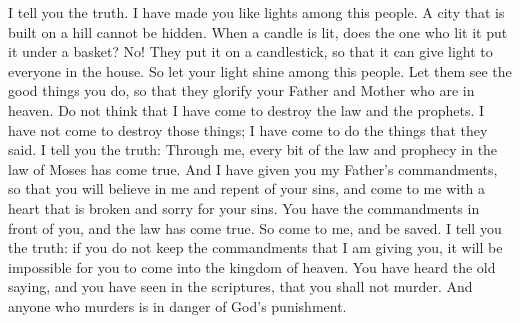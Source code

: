 I tell you the truth. I have made you like lights among this people. A city that is built on a hill cannot be hidden.
\bverse \iffalse Behold, do men light a candle and put it under a bushel? Nay, but on a candlestick, and it giveth light to all that are in the house; \fi
When a candle is lit, does the one who lit it put it under a basket? No! They put it on a candlestick, so that it can give light to everyone in the house.
\bverse \iffalse Therefore let your light so shine before this people, that they may see your good works and glorify your Father who is in heaven. \fi
So let your light shine among this people. Let them see the good things you do, so that they glorify your Father and Mother who are in heaven.
\bverse \iffalse Think not that I am come to destroy the law or the prophets.  I am not come to destroy but to fulfil; \fi
Do not think that I have come to destroy the law and the prophets. I have not come to destroy those things; I have come to do the things that they said.
\bverse \iffalse For verily I say unto you, one jot nor tittle hath not passed away from the law, but in me it hath all been fulfilled. \fi
I tell you the truth: Through me, every bit of the law and prophecy in the law of Moses has come true.
\bverse \iffalse And behold, I have given you the law and the commandments of my Father, that ye shall believe in me, and that ye shall repent of your sins, and come unto me with a broken heart and a contrite spirit. Behold, ye have the commandments before you, and the law is fulfilled. \fi
And I have given you my Father's commandments, so that you will believe in me and repent of your sins, and come to me with a heart that is broken and sorry for your sins. You have the commandments in front of you, and the law has come true.
\bverse \iffalse Therefore come unto me and be ye saved; for verily I say unto you, that except ye shall keep my commandments, which I have commanded you at this time, ye shall in no case enter into the kingdom of heaven. \fi
So come to me, and be saved. I tell you the truth: if you do not keep the commandments that I am giving you, it will be impossible for you to come into the kingdom of heaven.
\bverse \iffalse Ye have heard that it hath been said by them of old time, and it is also written before you, that thou shalt not kill, and whosoever shall kill shall be in danger of the judgment of God; \fi
You have heard the old saying, and you have seen in the scriptures, that you shall not murder. And anyone who murders is in danger of God's punishment.
